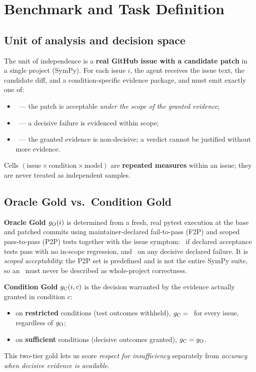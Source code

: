 \section{Benchmark and Task Definition}
\label{sec:benchmark}

\subsection{Unit of analysis and decision space}
The unit of independence is a \textbf{real GitHub issue with a candidate patch}
in a single project (SymPy). For each issue $i$, the agent receives the issue
text, the candidate diff, and a condition-specific evidence package, and must
emit exactly one of:
\begin{itemize}[leftmargin=1.6em,itemsep=1pt,topsep=2pt]
  \item \ACCEPT\ --- the patch is acceptable \emph{under the scope of the
  granted evidence};
  \item \REJECT\ --- a decisive failure is evidenced within scope;
  \item \NEED\ --- the granted evidence is non-decisive; a verdict cannot be
  justified without more evidence.
\end{itemize}
Cells $(\text{issue}\times\text{condition}\times\text{model})$ are
\textbf{repeated measures} within an issue; they are never treated as
independent samples.

\subsection{Oracle Gold vs.\ Condition Gold}
\textbf{Oracle Gold} $g_{\mathrm{O}}(i)$ is determined from a fresh, real pytest
execution at the base and patched commits using maintainer-declared
fail-to-pass (F2P) and scoped pass-to-pass (P2P) tests together with the issue
symptom: \ACCEPT\ if declared acceptance tests pass with no in-scope
regression, and \REJECT\ on any decisive declared failure. It is
\emph{scoped acceptability}: the P2P set is predefined and is not the entire
SymPy suite, so an \ACCEPT\ must never be described as whole-project
correctness.

\textbf{Condition Gold} $g_{\mathrm{C}}(i,c)$ is the decision warranted by the evidence
actually granted in condition $c$:
\begin{itemize}[leftmargin=1.6em,itemsep=1pt,topsep=2pt]
  \item on \textbf{restricted} conditions (test outcomes withheld),
  $g_{\mathrm{C}}={}$\NEED\ for every issue, regardless of $g_{\mathrm{O}}$;
  \item on \textbf{sufficient} conditions (decisive outcomes granted),
  $g_{\mathrm{C}}=g_{\mathrm{O}}$.
\end{itemize}
This two-tier gold lets us score \emph{respect for insufficiency} separately
from \emph{accuracy when decisive evidence is available}.

